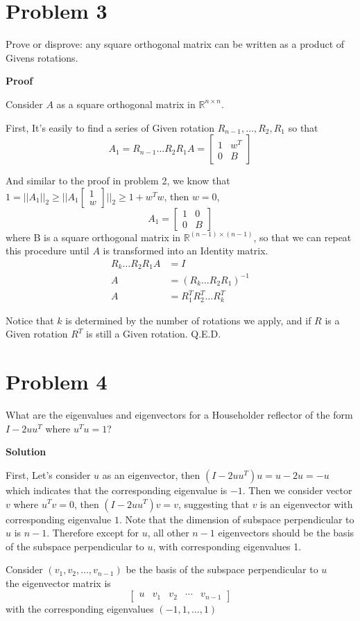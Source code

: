 \documentclass[12pt,oneside,a4paper]{article}
\newcommand{\problem}[1]
{
    \clearpage
    \section*{Problem {#1}}
}
\newcommand{\solution}
{
    \vspace{15pt}
    \noindent\ignorespaces\textbf{\large Solution}\par
}
\renewcommand{\proof}
{
    \vspace{15pt}
    \noindent\ignorespaces\textbf{\large Proof}\par
}
\begin{document}
\problem{3}
Prove or disprove: any square orthogonal matrix can be written as a product of Givens rotations.

\proof
Consider $A$ as a square orthogonal matrix in $\mathbb{R}^{n \times n}$.

First, It's easily to find a series of Given rotation $R_{n-1}, \dots, R_{2}, R_{1}$ so that 
$$A_{1} = R_{n-1}\dots R_{2}R_{1}A = \begin{bmatrix}
1 & w^{T} \\
0 & B
\end{bmatrix}$$

And similar to the proof in problem 2, we know that $1 = ||A_{1}||_{2} \geq ||A_{1}\begin{bmatrix}
1\\
w
\end{bmatrix}||_{2} \geq 1 + w^{T}w$, then $w = 0$, $$A_{1} = \begin{bmatrix}
1 & 0 \\
0 & B
\end{bmatrix}$$
where B is a square orthogonal matrix in $\mathbb{R}^{(n-1)\times (n-1)}$, so that we can repeat this procedure until $A$ is transformed into an Identity matrix.
$$\begin{aligned}
R_{k}\dots R_{2}R_{1}A &= I \\
A &= (R_{k}\dots R_{2}R_{1})^{-1} \\
A &= R_{1}^{T}R_{2}^{T}\dots R_{k}^{T}
\end{aligned}$$

Notice that $k$ is determined by the number of rotations we apply, and if $R$ is a Given rotation $R^{T}$ is still a Given rotation. Q.E.D.

\problem{4}
What are the eigenvalues and eigenvectors for a Householder reflector of the form $I - 2 u u^{T}$ where $u^{T} u = 1$?

\solution
First, Let's consider $u$ as an eigenvector, then $(I-2uu^{T})u = u - 2u = -u$ which indicates that the corresponding eigenvalue is $-1$. Then we consider vector $v$ where $u^{T}v = 0$, then $(I-2uu^{T})v = v$, suggesting that $v$ is an eigenvector with corresponding eigenvalue $1$. Note that the dimension of subspace perpendicular to $u$ is $n - 1$. Therefore except for $u$, all other $n - 1$ eigenvectors should be the basis of the subspace perpendicular to $u$, with corresponding eigenvalues 1.  

Consider $(v_{1}, v_{2}, \dots, v_{n-1})$ be the basis of the subspace perpendicular to $u$\\
the eigenvector matrix is 
$$\begin{bmatrix}
u & v_{1} & v_{2} & \cdots & v_{n-1}
\end{bmatrix}$$
with the corresponding eigenvalues $(-1, 1, \dots, 1)$
\end{document}

